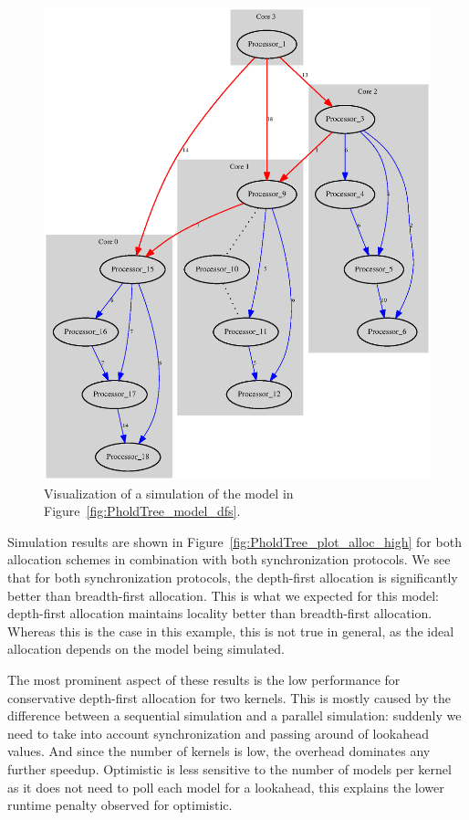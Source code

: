 \begin{figure}
    \center
    \includegraphics[width=\columnwidth]{fig/pholdtreed1n3t5000c4DFS.eps}
    \caption{Visualization of a simulation of the model in Figure~\ref{fig:PholdTree_model_dfs}.}
    \label{fig:pholdtree_visualize_parDFS}
\end{figure}

Simulation results are shown in Figure~\ref{fig:PholdTree_plot_alloc_high} for both allocation schemes in combination with both synchronization protocols.
We see that for both synchronization protocols, the depth-first allocation is significantly better than breadth-first allocation.
This is what we expected for this model: depth-first allocation maintains locality better than breadth-first allocation.
Whereas this is the case in this example, this is not true in general, as the ideal allocation depends on the model being simulated.

The most prominent aspect of these results is the low performance for conservative depth-first allocation for two kernels.
This is mostly caused by the difference between a sequential simulation and a parallel simulation: suddenly we need to take into account synchronization and passing around of lookahead values.
And since the number of kernels is low, the overhead dominates any further speedup.
Optimistic is less sensitive to the number of models per kernel as it does not need to poll each model for a lookahead, this explains the lower runtime penalty observed for optimistic.

